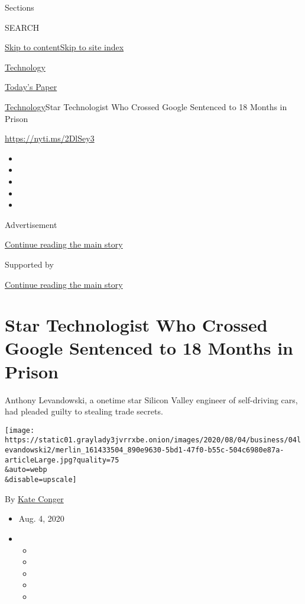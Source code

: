 Sections

SEARCH

\protect\hyperlink{site-content}{Skip to
content}\protect\hyperlink{site-index}{Skip to site index}

\href{https://www.nytimes3xbfgragh.onion/section/technology}{Technology}

\href{https://myaccount.nytimes3xbfgragh.onion/auth/login?response_type=cookie\&client_id=vi}{}

\href{https://www.nytimes3xbfgragh.onion/section/todayspaper}{Today's
Paper}

\href{/section/technology}{Technology}\textbar{}Star Technologist Who
Crossed Google Sentenced to 18 Months in Prison

\href{https://nyti.ms/2DlSey3}{https://nyti.ms/2DlSey3}

\begin{itemize}
\item
\item
\item
\item
\item
\end{itemize}

Advertisement

\protect\hyperlink{after-top}{Continue reading the main story}

Supported by

\protect\hyperlink{after-sponsor}{Continue reading the main story}

\hypertarget{star-technologist-who-crossed-google-sentenced-to-18-months-in-prison}{%
\section{Star Technologist Who Crossed Google Sentenced to 18 Months in
Prison}\label{star-technologist-who-crossed-google-sentenced-to-18-months-in-prison}}

Anthony Levandowski, a onetime star Silicon Valley engineer of
self-driving cars, had pleaded guilty to stealing trade secrets.

\texttt{[image: https://static01.graylady3jvrrxbe.onion/images/2020/08/04/business/04levandowski2/merlin\_161433504\_890e9630-5bd1-47f0-b55c-504c6980e87a-articleLarge.jpg?quality=75\\\&auto=webp\\\&disable=upscale]}

By \href{https://www.nytimes3xbfgragh.onion/by/kate-conger}{Kate Conger}

\begin{itemize}
\item
  Aug. 4, 2020
\item
  \begin{itemize}
  \item
  \item
  \item
  \item
  \item
  \end{itemize}
\end{itemize}

